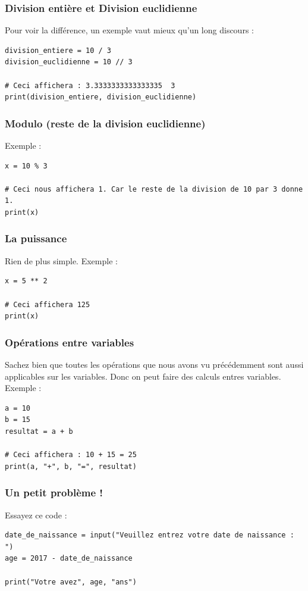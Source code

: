 \documentclass[12pt]{article}
\begin{document}
        \subsubsection{Division entière et Division euclidienne}
            Pour voir la différence, un exemple vaut mieux qu'un long discours :
            \begin{lstlisting}[style=code]
division_entiere = 10 / 3
division_euclidienne = 10 // 3

# Ceci affichera : 3.3333333333333335  3
print(division_entiere, division_euclidienne)
            \end{lstlisting}

        \subsubsection{Modulo (reste de la division euclidienne)}
            Exemple :
            \begin{lstlisting}[style=code, breaklines=false]
x = 10 % 3

# Ceci nous affichera 1. Car le reste de la division de 10 par 3 donne 1.
print(x) 
            \end{lstlisting}
        \subsubsection{La puissance}
            Rien de plus simple. Exemple :
            \begin{lstlisting}[style=code]
x = 5 ** 2

# Ceci affichera 125
print(x)
            \end{lstlisting}
        

        \subsubsection{Opérations entre variables}
            Sachez bien que toutes les opérations que nous avons vu précédemment sont aussi applicables sur les variables.
            Donc on peut faire des calculs entres variables. Exemple : 
            \begin{lstlisting}[style=code]
a = 10
b = 15
resultat = a + b

# Ceci affichera : 10 + 15 = 25
print(a, "+", b, "=", resultat)
            \end{lstlisting}

        \subsubsection{Un petit problème !}
            Essayez ce code : 
            \begin{lstlisting}[style=code, breaklines=false]
date_de_naissance = input("Veuillez entrez votre date de naissance : ")
age = 2017 - date_de_naissance

print("Votre avez", age, "ans")
            \end{lstlisting}
\end{document}
